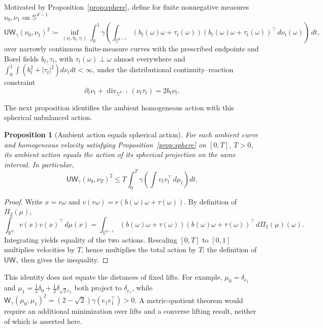 \documentclass{article}
\newtheorem{proposition}[theorem]{Proposition}
\newcommand{\R}{\mathbb{R}}
\newcommand{\Sd}{\mathbb{S}^{d-1}}
\newcommand{\Wg}{\mathsf{W}_{\gamma}}
\newcommand{\UWg}{\mathsf{UW}_{\gamma}}
\newcommand{\divS}{\operatorname{div}_{\Sd}}
\begin{document}
Motivated by Proposition~\ref{prop:sphere}, define for finite nonnegative
measures $\nu_0,\nu_1$ on $\Sd$
$$
\UWg(\nu_0,\nu_1)^2
\coloneqq 
\inf_{(\nu_t,b_t,\tau_t)}
\int_0^1
\gamma\!\left(
\int_{\Sd} (b_t(\omega)\omega+\tau_t(\omega))(b_t(\omega)\omega+\tau_t(\omega))^\top\,d\nu_t(\omega)
\right)\,dt,
$$
over narrowly continuous finite-measure curves with the prescribed endpoints
and Borel fields $b_t,\tau_t$, with $\tau_t(\omega)\perp\omega$ almost
everywhere and $\int_0^1\int(b_t^2+|\tau_t|^2)d\nu_tdt<\infty$, under the
distributional continuity--reaction constraint
$$
\partial_t\nu_t+\divS(\nu_t\tau_t)=2b_t\nu_t.
$$

The next proposition identifies the ambient homogeneous action with this spherical unbalanced action.
\begin{proposition}[Ambient action equals spherical action]
\label{prop:unbalanced}
For each ambient curve and homogeneous velocity satisfying
Proposition~\ref{prop:sphere} on $[0,T]$, $T>0$, its ambient action equals the
action of its spherical projection on the same interval. In particular,
\[
 \UWg(\nu_0,\nu_T)^2
 \le T\int_0^T\gamma\!\left(\int v_t v_t^\top\,d\mu_t\right)dt.
\]
\end{proposition}

\begin{proof}
Write $x=r\omega$ and $v(r\omega)=r(b(\omega)\omega+\tau(\omega))$. By definition of $\Pi_2(\mu)$,
$$
\int_{\R^d} v(x)v(x)^\top\,d\mu(x)
=
\int_{\Sd}(b(\omega)\omega+\tau(\omega))(b(\omega)\omega+\tau(\omega))^\top\,d\Pi_2(\mu)(\omega).
$$
Integrating yields equality of the two actions. Rescaling $[0,T]$ to
$[0,1]$ multiplies velocities by $T$, hence multiplies the total action by
$T$; the definition of $\UWg$ then gives the inequality.
\end{proof}

This identity does not equate the distances of fixed lifts. For example,
$\mu_0=\delta_{e_1}$ and
$\mu_1=\tfrac12\delta_0+\tfrac12\delta_{\sqrt2e_1}$ both project to
$\delta_{e_1}$, while
$\Wg(\mu_0,\mu_1)^2=(2-\sqrt2)\gamma(e_1e_1^\top)>0$.
A metric-quotient theorem would require an additional minimization over
lifts and a converse lifting result, neither of which is asserted here.
\end{document}
